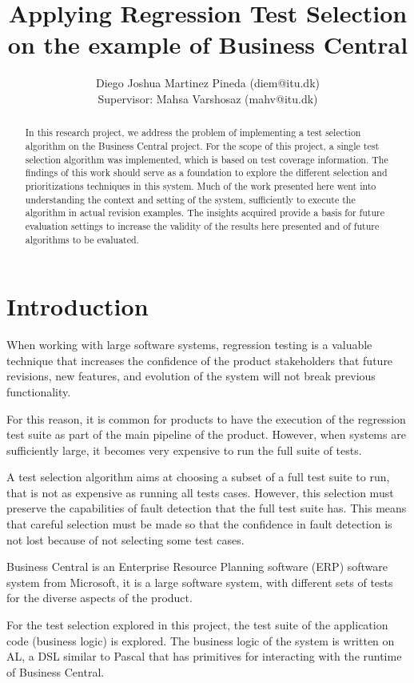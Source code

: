 \documentclass{article}
\title{Applying Regression Test Selection on the example of Business Central}
\author{Diego Joshua Martinez Pineda (diem@itu.dk)\\Supervisor: Mahsa Varshosaz (mahv@itu.dk)}
\begin{document}
\maketitle

\begin{abstract}
In this research project, we address the problem of implementing a test selection algorithm on the Business Central project. For the scope of this project, a single test selection algorithm was implemented, which is based on test coverage information. The findings of this work should serve as a foundation to explore the different selection and prioritizations techniques in this system. Much of the work presented here went into understanding the context and setting of the system, sufficiently to execute the algorithm in actual revision examples. The insights acquired provide a basis for future evaluation settings to increase the validity of the results here presented and of future algorithms to be evaluated.
\end{abstract}

\section{Introduction}
   When working with large software systems, regression testing is a valuable technique that increases the confidence of the product stakeholders that future revisions, new features, and evolution of the system will not break previous functionality.

   For this reason, it is common for products to have the execution of the regression test suite as part of the main pipeline of the product. However, when systems are sufficiently large, it becomes very expensive to run the full suite of tests.

   A test selection algorithm aims at choosing a subset of a full test suite to run, that is not as expensive as running all tests cases. However, this selection must preserve the capabilities of fault detection that the full test suite has. This means that careful selection must be made so that the confidence in fault detection is not lost because of not selecting some test cases.

   Business Central is an Enterprise Resource Planning software (ERP) software system from Microsoft, it is a large software system, with different sets of tests for the diverse aspects of the product.

   For the test selection explored in this project, the test suite of the application code (business logic) is explored. The business logic of the system is written on AL, a DSL similar to Pascal that has primitives for interacting with the runtime of Business Central.
\end{document}
